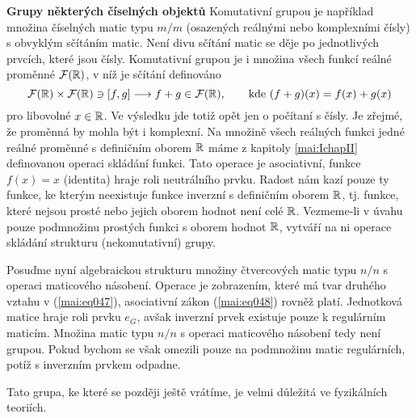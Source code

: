 \wikitextrule
\begin{example}\label{mai:exam050}
  \textbf{Grupy některých číselných objektů}\newline\small
    Komutativní grupou je například množina číselných matic typu \(m/m\) (osazených reálnými nebo 
    komplexními čísly) s obvyklým sčítáním matic. Není divu sčítání matic se děje po jednotlivých 
    prvcích, které jsou čísly. Komutativní grupou je i množina všech funkcí reálné proměnné 
    \(\mathcal{F}(\mathbb{R})\), v níž je sčítání definováno 
    \begin{equation*}
      \mathcal{F}(\mathbb{R})\times\mathcal{F}(\mathbb{R})\ni[f,g]\longrightarrow
      f + g \in\mathcal{F}(\mathbb{R}), \qquad\text{kde } (f+g)(x) = f(x) + g(x)
    \end{equation*}
    pro libovolné \(x \in\mathbb{R}\). Ve výsledku jde totiž opět jen o počítaní s čísly. Je zřejmé, 
    že proměnná by mohla být i komplexní. Na množině všech reálných funkci jedné reálné proměnné s 
    definičním oborem \(\mathbb{R}\) máme z kapitoly \ref{mai:IchapII} definovanou operaci skládání 
    funkci. Tato operace je asociativní, funkce \(f(x) = x\) (identita) hraje roli neutrálního 
    prvku. Radost nám kazí pouze ty funkce, ke kterým neexistuje funkce inverzní s definičním 
    oborem \(\mathbb{R}\), tj. funkce, které nejsou prosté nebo jejich oborem hodnot není celé 
    \(\mathbb{R}\). Vezmeme-li v úvahu pouze podmnožinu prostých funkci s oborem hodnot \(\mathbb{R}\), 
    vytváří na ni operace skládání strukturu (nekomutativní) grupy. 
    
    Posuďme nyní algebraickou strukturu množiny čtvercových matic typu \(n/n\) s operaci 
    maticového násobení. Operace je zobrazením, které má tvar druhého vztahu v (\ref{mai:eq047}), 
    asociativní zákon (\ref{mai:eq048}) rovněž platí. Jednotková matice hraje roli prvku \(e_G\), 
    avšak inverzní prvek existuje pouze k regulárním maticím. Množina matic typu \(n/n\) s operaci 
    maticového násobení tedy není grupou. Pokud bychom se však omezili pouze na podmnožinu matic 
    regulárních, potíž s inverzním prvkem odpadne. 
    
    
    Tato grupa, ke které se později ještě vrátíme, je velmi důležitá ve fyzikálních teoriích. 
  \normalsize
\end{example}